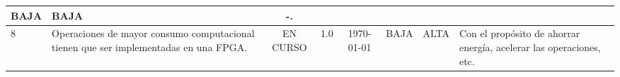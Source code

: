 \begin{landscape}
\begin{tabular}{| l | m{4.5cm} | c | c | c | c | c | m{5.5cm} |}
    BAJA &                                              %
    BAJA &                                             %
    -.\\\hline
    8 &                                                 %
    Operaciones de mayor consumo computacional tienen que ser implementadas en una FPGA.  &                                            %
    \cellcolor{yellow} EN CURSO & 1.0 & \today &       %
    BAJA &                                              %
    ALTA &                                              %
    Con el propósito de ahorrar energía, acelerar las operaciones, etc.\\\hline
    
\end{tabular}
\end{landscape}
